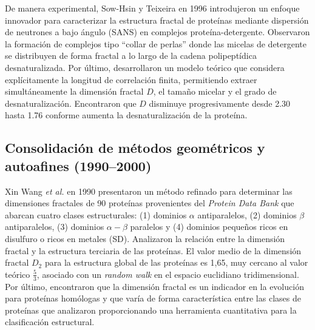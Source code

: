 De manera experimental, Sow-Hsin y Teixeira \cite{Chen1986} en 1996 introdujeron un enfoque innovador para caracterizar la estructura fractal de proteínas mediante dispersión de neutrones a bajo ángulo (SANS) en complejos proteína-detergente. Observaron la formación de complejos tipo ``collar de perlas'' donde las micelas de detergente se distribuyen de forma fractal a lo largo de la cadena polipeptídica desnaturalizada. Por último, desarrollaron un modelo teórico que considera explícitamente la longitud de correlación finita, permitiendo extraer simultáneamente la dimensión fractal $D$, el tamaño micelar y el grado de desnaturalización. Encontraron que $D$ disminuye progresivamente desde 2.30 hasta 1.76 conforme aumenta la desnaturalización de la proteína.

\subsection{Consolidación de métodos geométricos y autoafines (1990--2000)}


Xin Wang \textit{et al.} \cite{Wang1990} en 1990 presentaron un método refinado para determinar las dimensiones fractales de 90 proteínas provenientes del \textit{Protein Data Bank} que abarcan cuatro clases estructurales: (1) dominios $\alpha$ antiparalelos, (2) dominios $\beta$ antiparalelos, (3) dominios $\alpha-\beta$ paralelos y (4) dominios pequeños ricos en disulfuro o ricos en metales (SD). Analizaron la relación entre la dimensión fractal y la estructura terciaria de las proteínas. El valor medio de la dimensión fractal $D_{2}$ para la estructura global de las proteínas es 1,65, muy cercano al valor teórico $\frac{5}{3}$, asociado con un \textit{random walk} en el espacio euclidiano tridimensional. Por último, encontraron que la dimensión fractal es un indicador en la evolución para proteínas homólogas y que varía de forma característica entre las clases de proteínas que analizaron proporcionando una herramienta cuantitativa para la clasificación estructural.


